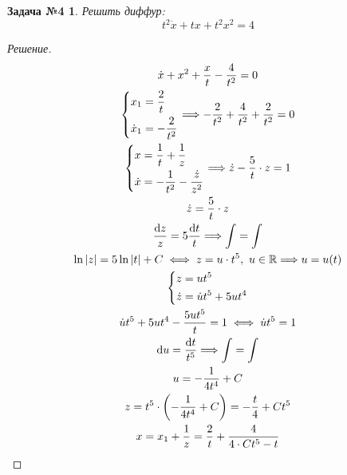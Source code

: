 \documentclass[a4paper,12pt]{article}
\newtheorem*{task4}{Задача №4}
\newcommand{\R}{\mathbb{R}}
\renewcommand*\d{\mathop{}\!\mathrm{d}}
\newcommand{\du}{\dot{u}}
\newcommand{\dx}{\dot{x}}
\newcommand{\dz}{\dot{z}}
\newcommand{\ds}{\displaystyle}
\begin{document}
\begin{task4}
Решить диффур:
\[t^2\dx + tx + t^2x^2 = 4\]
\end{task4}
\begin{proof}[Решение]
	\begin{gather*}
		\dx + x^2 + \dfrac{x}{t} - \dfrac{4}{t^2} = 0\\
		\left\{\begin{gathered}
		x_1 = \dfrac{2}{t}\hfill\\
		\dx_1 = -\dfrac{2}{t^2}\hfill
		\end{gathered}\right. \Longrightarrow -\dfrac{2}{t^2} + \dfrac{4}{t^2} + \dfrac{2}{t^2} = 0 \\
		\left\{\begin{gathered}
		x = \dfrac{1}{t} + \dfrac{1}{z}\hfill\\
		\dx = -\dfrac{1}{t^2} - \dfrac{\dz}{z^2}\hfill
		\end{gathered}\right. \Longrightarrow \dz - \dfrac{5}{t} \cdot z = 1\\
		\dz = \dfrac{5}{t} \cdot z\\
		\dfrac{\d z}{z} = 5\dfrac{\d t}{t} \Longrightarrow \ds\int = \int\\
		\ln|z| = 5\ln|t| + C \iff z = u\cdot t^5,\ u \in \R \Longrightarrow u = u(t)\\
		\left\{\begin{gathered}
		z = ut^5\hfill\\
		\dz = \du t^5 + 5ut^4\hfill
		\end{gathered}\right.\\
		\du t^5 + 5ut^4 - \dfrac{5ut^5}{t} = 1\iff \du t^5 = 1\\
		\d u = \dfrac{\d t}{t^5} \Longrightarrow \ds\int = \int\\
		u = -\dfrac{1}{4t^4} + C\\
		z = t^5 \cdot \left(-\dfrac{1}{4t^4} + C\right) = -\dfrac{t}{4} + Ct^5\\
		x = x_1 + \dfrac{1}{z} = \dfrac{2}{t} + \dfrac{4}{4\cdot Ct^5 - t}
	\end{gather*}
\end{proof}
\end{document}
